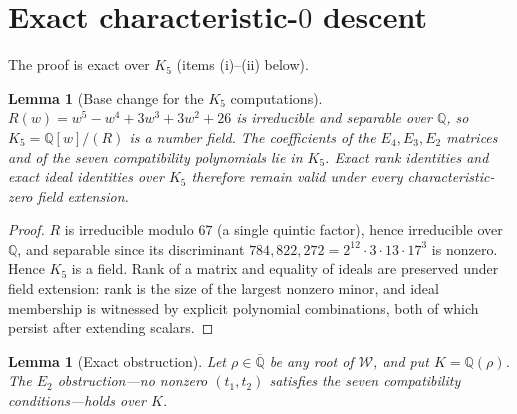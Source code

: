 \documentclass[a4paper,11pt]{article}
\theoremstyle{plain}
\newtheorem{lemma}[theorem]{Lemma}
\theoremstyle{definition}
\theoremstyle{remark}
\begin{document}
\section{Exact characteristic-\texorpdfstring{$0$}{0} descent}\label{ab:sec:lifting}

The proof is exact over $K_5$ (items (i)--(ii) below).

\begin{lemma}[Base change for the $K_5$ computations]\label{ab:lem:basechange}
$R(w)=w^5-w^4+3w^3+3w^2+26$ is irreducible and separable over $\mathbb{Q}$, so $K_5=\mathbb{Q}[w]/(R)$ is a number field. The coefficients of the $E_4,E_3,E_2$ matrices and of the seven compatibility polynomials lie in $K_5$. Exact rank identities and exact ideal identities over $K_5$ therefore remain valid under every characteristic-zero field extension.
\end{lemma}

\begin{proof}
$R$ is irreducible modulo $67$ (a single quintic factor), hence irreducible over $\mathbb{Q}$, and separable since its discriminant $784{,}822{,}272=2^{12}\cdot3\cdot13\cdot17^3$ is nonzero. Hence $K_5$ is a field. Rank of a matrix and equality of ideals are preserved under field extension: rank is the size of the largest nonzero minor, and ideal membership is witnessed by explicit polynomial combinations, both of which persist after extending scalars.
\end{proof}

\begin{lemma}[Exact obstruction]\label{ab:lem:lifting}
Let $\rho\in\overline{\mathbb{Q}}$ be any root of $\mathcal{W}$, and put $K=\mathbb{Q}(\rho)$. The $E_2$ obstruction---no nonzero $(t_1,t_2)$ satisfies the seven compatibility conditions---holds over $K$.
\end{lemma}
\end{document}
